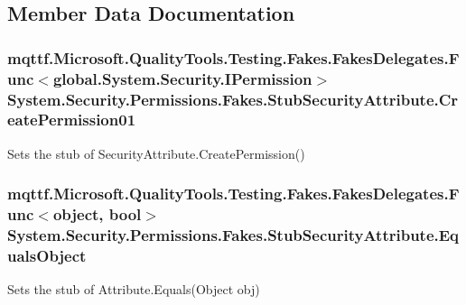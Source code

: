 \subsection{Member Data Documentation}
\hypertarget{class_system_1_1_security_1_1_permissions_1_1_fakes_1_1_stub_security_attribute_ad56aaaec65492873e58ac59294d87a11}{
\subsubsection[{Create\-Permission01}]{\setlength{\rightskip}{0pt plus 5cm}mqttf.\-Microsoft.\-Quality\-Tools.\-Testing.\-Fakes.\-Fakes\-Delegates.\-Func$<$global.\-System.\-Security.\-I\-Permission$>$ System.\-Security.\-Permissions.\-Fakes.\-Stub\-Security\-Attribute.\-Create\-Permission01}}\label{class_system_1_1_security_1_1_permissions_1_1_fakes_1_1_stub_security_attribute_ad56aaaec65492873e58ac59294d87a11}


Sets the stub of Security\-Attribute.\-Create\-Permission()

\hypertarget{class_system_1_1_security_1_1_permissions_1_1_fakes_1_1_stub_security_attribute_a5e555233e964174131a317544decb94f}{
\subsubsection[{Equals\-Object}]{\setlength{\rightskip}{0pt plus 5cm}mqttf.\-Microsoft.\-Quality\-Tools.\-Testing.\-Fakes.\-Fakes\-Delegates.\-Func$<$object, bool$>$ System.\-Security.\-Permissions.\-Fakes.\-Stub\-Security\-Attribute.\-Equals\-Object}}\label{class_system_1_1_security_1_1_permissions_1_1_fakes_1_1_stub_security_attribute_a5e555233e964174131a317544decb94f}


Sets the stub of Attribute.\-Equals(\-Object obj)

